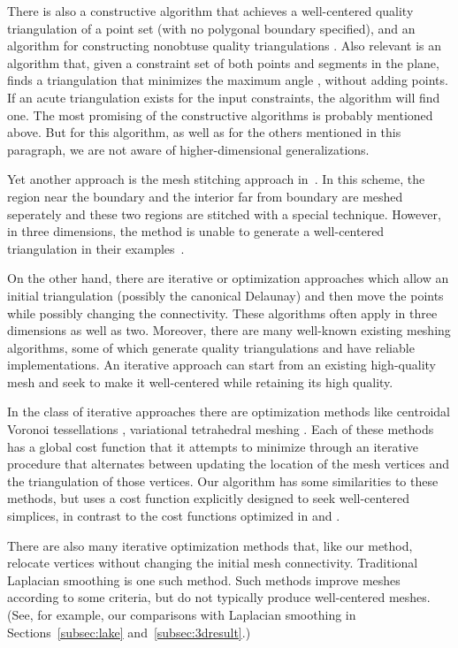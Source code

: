 \documentclass[final]{siamltex}
\begin{document}
There is also a constructive algorithm that achieves a well-centered
quality triangulation of a point set \cite{BeEpGi1994} (with no
polygonal boundary specified), and an algorithm for constructing
nonobtuse quality triangulations \cite{MeSo1992}.  Also relevant is an
algorithm that, given a constraint set of both points and segments in
the plane, finds a triangulation that minimizes the maximum angle
\cite{EdTaWa1992}, without adding points.  If an acute triangulation
exists for the input constraints, the algorithm will find one.  The
most promising of the constructive algorithms is probably
\cite{ErUn2007} mentioned above. But for this algorithm, as well as
for the others mentioned in this paragraph, we are not aware of
higher-dimensional generalizations.

Yet another approach is the mesh stitching approach
in~\cite{SaHaMoWe2006,SaHaMoWe2007,SaWaHaMoWe2006}. In this scheme, the
region near the boundary and the interior far from boundary are meshed
seperately and these two regions are stitched with a special
technique. However, in three dimensions, the method is unable to
generate a well-centered triangulation in their
examples~\cite{SaHaMoWe2006}.

On the other hand, there are iterative or optimization approaches
which allow an initial triangulation (possibly the canonical Delaunay)
and then move the points while possibly changing the connectivity.
These algorithms often apply in three dimensions as well as two.
Moreover, there are many well-known existing meshing algorithms, some
of which generate quality triangulations \cite{Ruppert1995,
  Edelsbrunner2001} and have reliable implementations. An iterative
approach can start from an existing high-quality mesh and seek to make
it well-centered while retaining its high quality.

In the class of
iterative approaches there are optimization methods like centroidal
Voronoi tessellations \citep{DuFaGu1999, DuGuJu2003, DuWa2005},
variational tetrahedral meshing \cite{AlCoYvDe2005}.
Each of these methods has a global cost function that
it attempts to minimize
through an iterative procedure that alternates between updating the
location of the mesh vertices and the triangulation of those vertices.
Our algorithm has some similarities to these methods, but uses a cost
function explicitly designed to seek well-centered simplices, in
contrast to the cost functions optimized in \cite{DuFaGu1999} and
\cite{AlCoYvDe2005}.

There are also many iterative optimization methods
that, like our method, relocate vertices without changing the
initial mesh connectivity.  Traditional Laplacian
smoothing\cite{Winslow1964} is one such method.  Such methods
improve meshes according to some criteria, but do not
typically produce well-centered meshes.  (See, for example,
our comparisons with Laplacian smoothing in
Sections~\ref{subsec:lake} and~\ref{subsec:3dresult}.)
\end{document}
